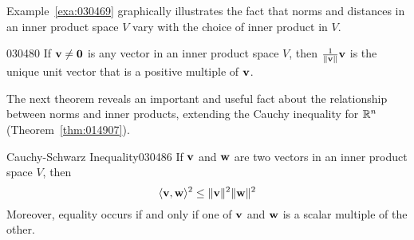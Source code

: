 \noindent Example~\ref{exa:030469} graphically illustrates the fact that norms and distances in an inner product space $V$ vary with the choice of inner product in $V$.

\begin{theorem}{}{030480}
If $\textbf{v} \neq \textbf{0}$ is any vector in an inner product space $V$, then $\tfrac{1}{\| \textbf{v} \|} \textbf{v}$ is the unique unit vector that is a positive multiple of $\textbf{v}$.
\end{theorem}

The next theorem reveals an important and useful fact about the relationship between norms and inner products, extending the Cauchy inequality for $\mathbb{R}^n$ (Theorem~\ref{thm:014907}).

\begin{theorem}{Cauchy-Schwarz Inequality\footnotemark}{030486}
If $\textbf{v}$ and $\textbf{w}$ are two vectors in an inner product space $V$, then
\begin{equation*}
\langle \textbf{v}, \textbf{w} \rangle^2 \leq \| \textbf{v} \|^2 \| \textbf{w} \|^2
\end{equation*}
Moreover, equality occurs if and only if one of $\textbf{v}$ and $\textbf{w}$ is a scalar multiple of the other.
\end{theorem}

